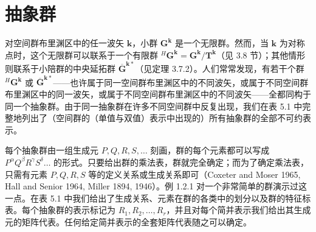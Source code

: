 \section{抽象群}

对空间群布里渊区中的任一波矢 $\mathbf{k}$，小群 $\mathbf{G}^{\mathbf{k}}$ 是一个无限群。然而，当 $\mathbf{k}$ 为对称点时，这个无限群可以联系于一个有限群 ${}^{H}\mathbf{G}^{\mathbf{k}} = \mathbf{G}^{\mathbf{k}}/\mathbf{T}^{\mathbf{k}}$（见 3.8 节）；其他情形则联系于小陪群的中央延拓群 $\overline{\mathbf{G}}^{\mathbf{k}*}$（见定理 3.7.2）。人们常常发现，有若干个群 ${}^{H}\mathbf{G}^{\mathbf{k}}$ 或 $\overline{\mathbf{G}}^{\mathbf{k}*}$——也许属于同一空间群布里渊区中的不同波矢，或属于不同空间群布里渊区中的同一波矢，或属于不同空间群布里渊区中的不同波矢——全都同构于同一个抽象群。由于同一抽象群在许多不同空间群中反复出现，我们在表 5.1 中完整地列出了（空间群的（单值与双值）表示中出现的）所有抽象群的全部不可约表示。

每个抽象群由一组生成元 $P, Q, R, S, \dots$ 刻画，群的每个元素都可以写成 $P^{\alpha}Q^{\beta}R^{\gamma}S^{\delta}\dots$ 的形式。只要给出群的乘法表，群就完全确定；而为了确定乘法表，只需有元素 $P, Q, R, S$ 等的定义关系或生成关系即可（Coxeter and Moser 1965, Hall and Senior 1964, Miller 1894, 1946）。例 1.2.1 对一个非常简单的群演示过这一点。在表 5.1 中我们给出了生成关系、元素在群的各类中的划分以及群的特征标表。每个抽象群的表示标记为 $R_{1}, R_{2}, \dots, R_{r}$，并且对每个简并表示我们给出其生成元的矩阵代表。任何给定简并表示的全套矩阵代表随之可以确定。



